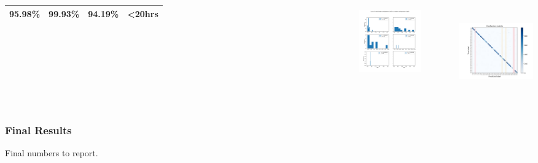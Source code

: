 \documentclass[8pt]{beamer}
\begin{document}
\begin{frame}
\begin{columns}
\begin{tabular*}{\textwidth}{|c|c|c|c|}
		95.98\% & 99.93\% & 94.19\% & \textless20hrs \\
		\hline
	\end{tabular*}
	\begin{figure}
		\includegraphics[height=3.1cm, width=4.5cm]{../plots/plot_performance_histogram.png}
	\end{figure}
	\includegraphics[height=4cm, width=\textwidth]{../plots/confusion_matrix_20.png}
\end{columns}
\pause
\vspace{0.2cm}
\end{frame}


\begin{frame}
\frametitle{Final Results}
Final numbers to report.
\end{frame}
\end{document}
